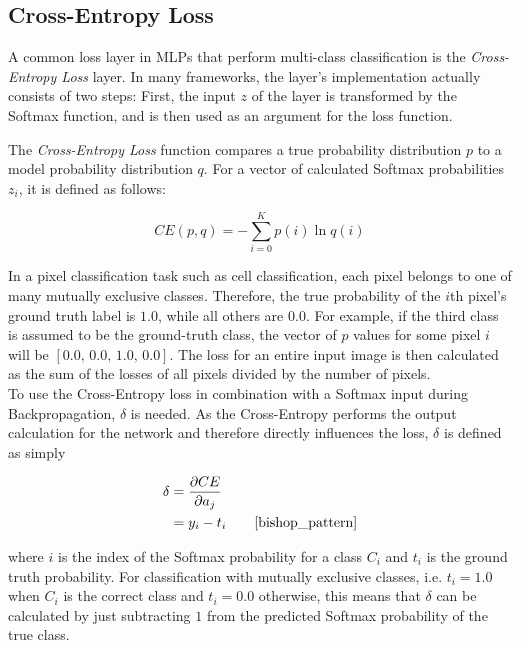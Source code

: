 		\subsection{Cross-Entropy Loss}
\label{subsec:cross_ent}

A common loss layer in MLPs that perform multi-class classification is the \textit{Cross-Entropy Loss} layer. In many frameworks, the layer's implementation actually consists of two steps: First, the input $z$ of the layer is transformed by the Softmax function, and is then used as an argument for the loss function.

The \textit{Cross-Entropy Loss} function compares a true probability distribution $p$ to a model probability distribution $q$. For a vector of calculated Softmax probabilities $z_i$, it is defined as follows:

\[CE(p, q) = -\sum \limits_{i = 0}^{K} p(i) \ln q(i)\]

\noindent In a pixel classification task such as cell classification, each pixel belongs to one of many mutually exclusive classes. Therefore, the true probability of the $i$th pixel's ground truth label is $1.0$, while all others are $0.0$. For example, if the third class is assumed to be the ground-truth class, the vector of $p$ values for some pixel $i$ will be $[0.0,\, 0.0,\, 1.0,\, 0.0]$. The loss for an entire input image is then calculated as the sum of the losses of all pixels divided by the number of pixels.\\

\noindent To use the Cross-Entropy loss in combination with a Softmax input during Backpropagation, $\delta$ is needed. As the Cross-Entropy performs the output calculation for the network and therefore directly influences the loss, $\delta$ is defined as simply

\begin {align} \delta &= \frac{\partial CE}{\partial a_j}\\  
			    &= y_i - t_i \hspace{2em}\cite[\text{ p. 209}]{bishop_pattern}
\end {align}

\noindent where $i$ is the index of the Softmax probability for a class $C_i$ and $t_i$ is the ground truth probability. For classification with mutually exclusive classes, i.e. $t_i = 1.0$ when $C_i$ is the correct class and $t_i = 0.0$ otherwise, this means that $\delta$ can be calculated by just subtracting $1$ from the predicted Softmax probability of the true class.


